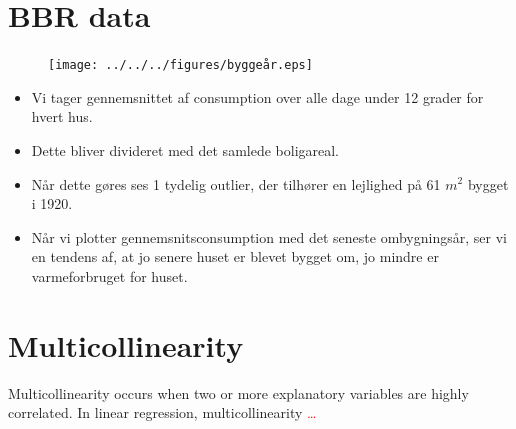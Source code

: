 
\section{BBR data}

\begin{figure}
    \centering
    \texttt{[image: ../../../figures/byggeår.eps]}
    \caption{}
    \label{fig: byggeår}
\end{figure}

\begin{itemize}
    \item Vi tager gennemsnittet af consumption over alle dage under 12 grader for hvert hus.
    \item Dette bliver divideret med det samlede boligareal.
    \item Når dette gøres ses 1 tydelig outlier, der tilhører en lejlighed på 61 $m^2$ bygget i 1920.
    \item Når vi plotter gennemsnitsconsumption med det seneste ombygningsår, ser vi en tendens af, at jo senere huset er blevet bygget om, jo mindre er varmeforbruget for huset.
\end{itemize}    

\section{Multicollinearity}
Multicollinearity occurs when two or more explanatory variables are highly correlated. In linear regression, multicollinearity \textcolor{red}{\dots} \\

